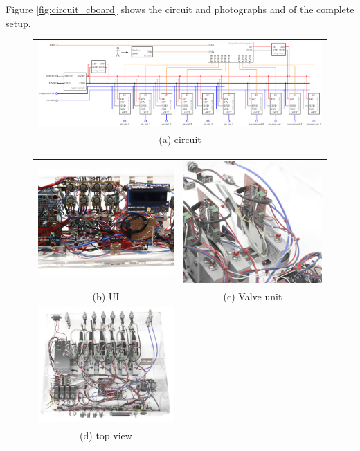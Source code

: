 \documentclass[
	fontsize=10pt
	paper=a4
]{scrartcl}
\begin{document}
Figure \ref{fig:circuit_cboard} shows the circuit and photographs and of the complete setup.

\begin{figure}[h!]
\begin{center}
\begin{tabular}{c}
\includegraphics[width=.98\textwidth]{Images/circuit_CBoard/circuit_CBoard.pdf} \\
(a) circuit \\
\end{tabular}

\begin{tabular}{cc}
\includegraphics[width=.48\textwidth]{Images/circuit_HUI/circuit_HUI.jpg} &
\includegraphics[width=.48\textwidth]{Images/circuit_ValveUnit/circuit_ValveUnit.jpg} \\
(b) UI & (c) Valve unit \\
\includegraphics[width=.48\textwidth]{Images/circuit_CBoard/circuit_CBoard.jpg} \\
(d) top view \\
\end{tabular}
\end{center}


\end{figure}
\end{document}
